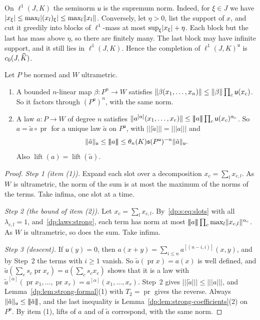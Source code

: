 On $\ell^1(J,K)$ the seminorm $\mathsf u$ is the supremum norm. Indeed, for $\xi\in J$ we have $\lvert x_\xi\rvert\le\max_l\lvert (x_l)_\xi\rvert\le\max_l\lVert x_l\rVert$. Conversely, let $\eta>0$, list the support of $x$, and cut it greedily into blocks of $\ell^1$-mass at most $\sup_\xi\lvert x_\xi\rvert+\eta$. Each block but the last has mass above $\eta$, so there are finitely many. The last block may have infinite support, and it still lies in $\ell^1(J,K)$. Hence the completion of $\ell^1(J,K)^{\mathsf u}$ is $c_0(J,\widehat K)$.

\begin{proposition}\label{dp:prop:hull}
Let $P$ be normed and $W$ ultrametric.
\begin{enumerate}
\item A bounded $n$\nobreakdash-linear map $\beta\colon P^n\to W$ satisfies $\lVert \beta(x_1,\dots,x_n)\rVert\le\lVert \beta\rVert\prod_c\mathsf u(x_c)$. So it factors through $(P^{\mathsf u})^n$, with the same norm.
\item A law $a\colon P\to W$ of degree $n$ satisfies $\lVert a^{[\alpha]}(x_1,\dots,x_r)\rVert\le\lvert\!\lvert\!\lvert a\rvert\!\rvert\!\rvert\prod_c\mathsf u(x_c)^{\alpha_c}$. So $a=\tilde a\circ\operatorname{pr}$ for a unique law $\tilde a$ on $P^{\mathsf u}$, with $\lvert\!\lvert\!\lvert \tilde a\rvert\!\rvert\!\rvert=\lvert\!\lvert\!\lvert a\rvert\!\rvert\!\rvert$ and
\[
 \lVert \tilde a\rVert_{\mathsf u}\le\lvert\!\lvert\!\lvert a\rvert\!\rvert\!\rvert\le\theta_n(K)\mathfrak s(P^{\mathsf u})^{-n}\lVert \tilde a\rVert_{\mathsf u}.
\]
Also $\operatorname{lift}(a)=\operatorname{lift}(\tilde a)$.
\end{enumerate}
\end{proposition}

\begin{proof}
\emph{Step 1 (item (1)).} Expand each slot over a decomposition $x_c=\sum_lx_{c,l}$. As $W$ is ultrametric, the norm of the sum is at most the maximum of the norms of the terms. Take infima, one slot at a time.

\emph{Step 2 (the bound of item (2)).} Let $x_c=\sum_lx_{c,l}$. By~\eqref{dp:s:eq:slots} with all $\lambda_{c,l}=1$, and~\eqref{dp:laws:strong}, each term has norm at most $\lvert\!\lvert\!\lvert a\rvert\!\rvert\!\rvert\prod_c\max_l\lVert x_{c,l}\rVert^{\alpha_c}$. As $W$ is ultrametric, so does the sum. Take infima.

\emph{Step 3 (descent).} If $\mathsf u(y)=0$, then $a(x+y)=\sum_{i\le n}a^{[(n-i,i)]}(x,y)$, and by Step~2 the terms with $i\ge1$ vanish. So $\tilde a(\operatorname{pr}x)=a(x)$ is well defined, and $\tilde a(\sum_cs_c\operatorname{pr}x_c)=a(\sum_cs_cx_c)$ shows that it is a law with $\tilde a^{[\alpha]}(\operatorname{pr}x_1,\dots,\operatorname{pr}x_r)=a^{[\alpha]}(x_1,\dots,x_r)$. Step~2 gives $\lvert\!\lvert\!\lvert \tilde a\rvert\!\rvert\!\rvert\le\lvert\!\lvert\!\lvert a\rvert\!\rvert\!\rvert$, and Lemma~\ref{dp:lem:strong-formal}(1) with $T_2=\operatorname{pr}$ gives the reverse. Always $\lVert \tilde a\rVert_{\mathsf u}\le\lvert\!\lvert\!\lvert \tilde a\rvert\!\rvert\!\rvert$, and the last inequality is Lemma~\ref{dp:lem:strong-coefficients}(2) on $P^{\mathsf u}$. By item (1), lifts of $a$ and of $\tilde a$ correspond, with the same norm.
\end{proof}

